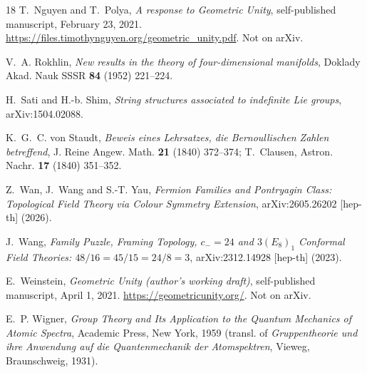 \documentclass[11pt]{article}
\theoremstyle{definition}
\theoremstyle{remark}
\begin{document}
\begin{thebibliography}{18}
T.~Nguyen and T.~Polya, \emph{A response to Geometric Unity}, self-published manuscript, February 23, 2021.
\url{https://files.timothynguyen.org/geometric_unity.pdf}. Not on arXiv.

V.~A. Rokhlin, \emph{New results in the theory of four-dimensional manifolds}, Doklady Akad. Nauk SSSR
\textbf{84} (1952) 221--224.

H.~Sati and H.-b. Shim, \emph{String structures associated to indefinite Lie groups}, arXiv:1504.02088.

K.~G.~C. von Staudt, \emph{Beweis eines Lehrsatzes, die Bernoullischen Zahlen betreffend}, J. Reine Angew. Math.
\textbf{21} (1840) 372--374; T.~Clausen, Astron. Nachr. \textbf{17} (1840) 351--352.

Z.~Wan, J.~Wang and S.-T. Yau, \emph{Fermion Families and Pontryagin Class: Topological Field Theory via Colour
Symmetry Extension}, arXiv:2605.26202 [hep-th] (2026).

J.~Wang, \emph{Family Puzzle, Framing Topology, $c_-=24$ and $3(E_8)_1$ Conformal Field Theories:
$48/16 = 45/15 = 24/8 = 3$}, arXiv:2312.14928 [hep-th] (2023).

E.~Weinstein, \emph{Geometric Unity (author's working draft)}, self-published manuscript, April 1, 2021.
\url{https://geometricunity.org/}. Not on arXiv.

E.~P. Wigner, \emph{Group Theory and Its Application to the Quantum Mechanics of Atomic Spectra}, Academic Press,
New York, 1959 (transl. of \emph{Gruppentheorie und ihre Anwendung auf die Quantenmechanik der Atomspektren},
Vieweg, Braunschweig, 1931).

\end{thebibliography}
\end{document}
